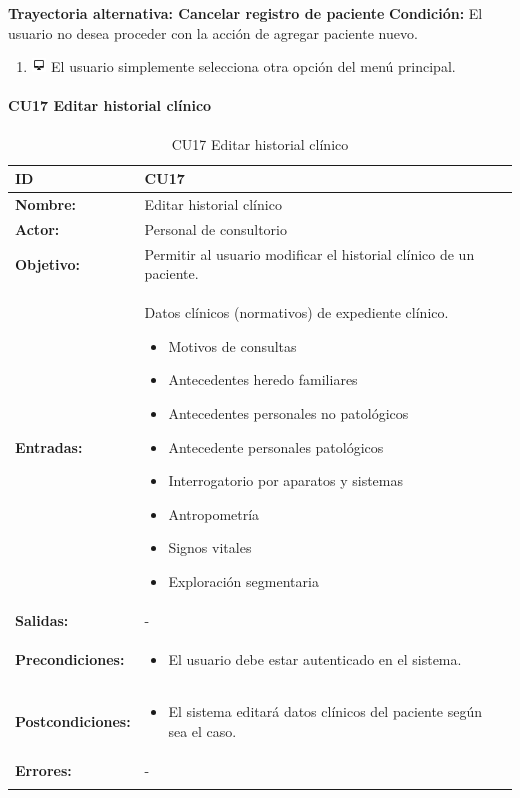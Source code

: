 \textbf{Trayectoria alternativa: Cancelar registro de paciente} \bigskip
\vspace{0.3em}
\textbf{Condición:} El usuario no desea proceder con la acción de agregar paciente nuevo.
\begin{enumerate}
\item \includegraphics[height=1em]{pictures/sistema.png} El usuario simplemente selecciona otra opción del menú principal.
\end{enumerate} \bigskip




\paragraph{CU17 Editar historial clínico}

\begin{longtable}[H]{|p{}|p{12cm}|}
\hline\textbf{ID}         
& \textbf{CU17}            \\ \hline
\textbf{Nombre:}          
& Editar historial clínico  \\ \hline
\textbf{Actor:}          
& Personal de consultorio   \\ \hline
\textbf{Objetivo:}       
& Permitir al usuario modificar el historial clínico de un paciente.\\ \hline
\textbf{Entradas:}  & 
Datos clínicos (normativos) de expediente clínico.
\begin{itemize}[nosep]
\item Motivos de consultas
\item Antecedentes heredo familiares
\item Antecedentes personales no patológicos
\item Antecedente personales patológicos
\item Interrogatorio por aparatos y sistemas
\item Antropometría
\item Signos vitales
\item Exploración segmentaria
\end{itemize}
\\ \hline
\textbf{Salidas:}  & -
\\ \hline
\textbf{Precondiciones:}  &             
\begin{itemize}[nosep]
\item El usuario debe estar autenticado en el sistema.
\end{itemize}
\\ \hline
\textbf{Postcondiciones:} & 
\begin{itemize}[nosep]
\item El sistema editará datos clínicos del paciente según sea el caso.
\end{itemize}
\\ \hline
\textbf{Errores:} &  -
\\ \hline
\caption{CU17 Editar historial clínico}
\label{table:1}
\end{longtable}


